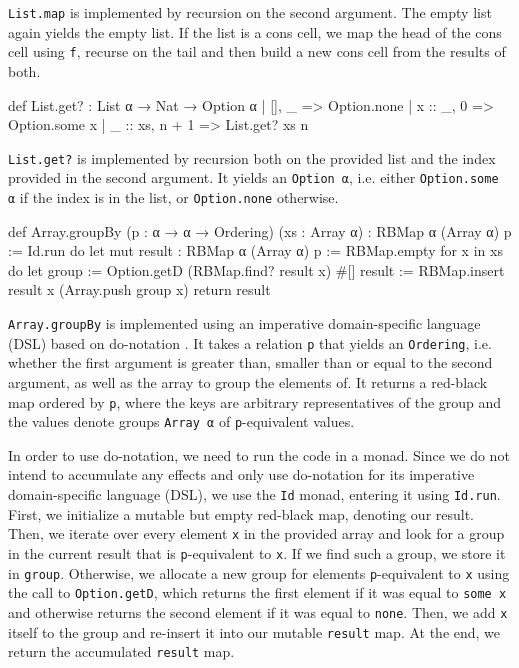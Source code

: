 \lstinline|List.map| is implemented by recursion on the second argument. The empty list again yields the empty list. If the list is a cons cell, we map the head of the cons cell using \lstinline|f|, recurse on the tail and then build a new cons cell from the results of both.\\
\begin{code}
def List.get? : List α → Nat → Option α
  | [],      _     => Option.none
  | x :: _,  0     => Option.some x
  | _ :: xs, n + 1 => List.get? xs n
\end{code}

\lstinline|List.get?| is implemented by recursion both on the provided list and the index provided in the second argument. It yields an \lstinline|Option α|, i.e. either \lstinline|Option.some α| if the index is in the list, or \lstinline|Option.none| otherwise.\\
\begin{code}
def Array.groupBy (p : α → α → Ordering) (xs : Array α)
  : RBMap α (Array α) p := Id.run do
  let mut result : RBMap α (Array α) p := RBMap.empty
  for x in xs do
    let group := Option.getD (RBMap.find? result x) #[]
    result := RBMap.insert result x (Array.push group x)
  return result
\end{code}

\lstinline|Array.groupBy| is implemented using an imperative domain-specific language (DSL) based on do-notation \citep{ullrich_beyond_2022}. It takes a relation \lstinline|p| that yields an \lstinline|Ordering|, i.e. whether the first argument is greater than, smaller than or equal to the second argument, as well as the array to group the elements of. It returns a red-black map ordered by \lstinline|p|, where the keys are arbitrary representatives of the group and the values denote groups \lstinline|Array α| of \lstinline|p|-equivalent values.

In order to use do-notation, we need to run the code in a monad. Since we do not intend to accumulate any effects and only use do-notation for its imperative domain-specific language (DSL), we use the \lstinline|Id| monad, entering it using \lstinline|Id.run|. First, we initialize a mutable but empty red-black map, denoting our result. Then, we iterate over every element \lstinline|x| in the provided array and look for a group in the current result that is \lstinline|p|-equivalent to \lstinline|x|. If we find such a group, we store it in \lstinline|group|. Otherwise, we allocate a new group for elements \lstinline|p|-equivalent to \lstinline|x| using the call to \lstinline|Option.getD|, which returns the first element if it was equal to \lstinline|some x| and otherwise returns the second element if it was equal to \lstinline|none|. Then, we add \lstinline|x| itself to the group and re-insert it into our mutable \lstinline|result| map. At the end, we return the accumulated \lstinline|result| map.

